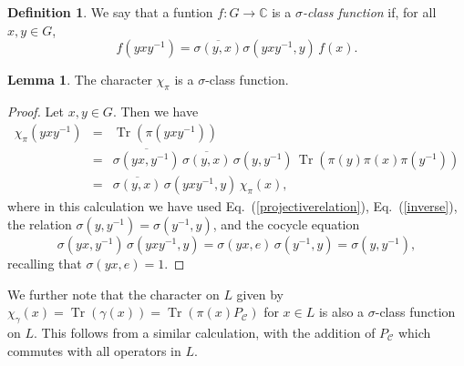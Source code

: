 \documentclass[11pt]{article}
\theoremstyle{definition}
\newtheorem{lemma}{Lemma}
\newtheorem{definition}{Definition}
\newcommand{\Tr}{\operatorname{Tr}}
\begin{document}
\begin{definition}
    We say that a funtion $f: G \rightarrow \mathbb C$ is a {\it $\sigma$-class function} if, for all $x,y\in G$,  
    \begin{equation*}
        f(yxy^{-1}) = \overline{\sigma(y,x)}\sigma(yxy^{-1},y)  \, f(x).
    \end{equation*}
\end{definition}

\begin{lemma} 
    The character $\chi_\pi$ is a $\sigma$-class function. 
\end{lemma} 
\begin{proof} 
    Let $x,y\in G$. Then we have 
    \begin{eqnarray*}
        \chi_\pi(yxy^{-1}) &=& \Tr(\pi(yxy^{-1})) \\ 
        &=&  \overline{\sigma(yx,y^{-1})} \, \overline{\sigma(y,x)} \, \sigma(y,y^{-1}) \, \Tr(\pi(y)\pi(x) \pi(y^{-1})) \\
        &=&  \overline{\sigma(y,x)} \, \sigma(yxy^{-1},y) \,       \chi_\pi(x) , 
    \end{eqnarray*}
    where in this calculation we have used Eq.~(\ref{projectiverelation}), Eq.~(\ref{inverse}), the relation $\sigma(y,y^{-1}) = \sigma(y^{-1},y)$, and the cocycle equation 
    \[
    \sigma(yx,y^{-1}) \, \sigma(yxy^{-1},y) = \sigma(yx,e) \, \sigma(y^{-1},y) = \sigma(y, y^{-1}), 
    \]
    recalling that $ \sigma(yx,e) = 1$. 
\end{proof}

We further note that the character on $L$ given by $\chi_\gamma(x) = \Tr(\gamma(x))= \Tr(\pi(x)P_{\mathcal C})$ for $x\in L$ is also a $\sigma$-class function on $L$. This follows from a similar calculation, with the addition of $P_{\mathcal C}$ which commutes with all operators in $L$. 
\end{document}

